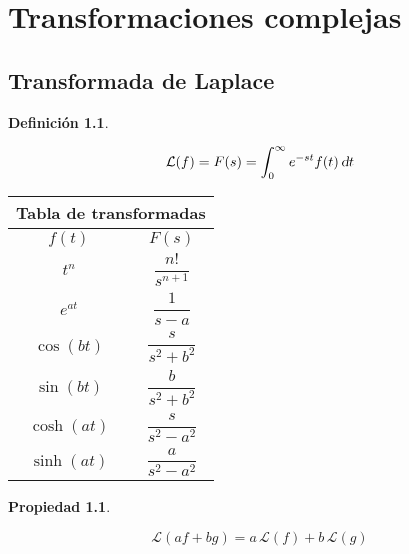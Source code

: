 \documentclass[a5paper,12pt,twoside]{book}
\newtheorem{defn}{{Definición}}[chapter]
\newtheorem{prop}{{Propiedad}}[chapter]
\begin{document}
\chapter{Transformaciones complejas}


\section{Transformada de Laplace}

\begin{mdframed}[style=MyFrame1]
    \begin{defn}
    \end{defn}
    \begin{equation*}
        \mathcal{L}(f) = F(s) = \int_0^\infty e^{-st} f(t) \, \textsl{d} t
    \end{equation*}
\end{mdframed}

\begin{center}
    \renewcommand{\arraystretch}{2.5}
    \begin{tabular}{|c|c|}
        \hline
        \multicolumn{2}{|c|}{Tabla de transformadas}
        \\ \hline \hline
        $f(t)$ & $F(s)$
        \\ \hline \hline
        $t^n$ & $\dfrac{n!}{s^{n+1}}$
        \\ \hline
        $e^{at}$ & $\dfrac{1}{s-a} $
        \\ \hline
        $\cos(bt)$ & $\dfrac{s}{s^2+b^2}$
        \\ \hline
        $\sin(bt)$ & $\dfrac{b}{s^2+b^2}$
        \\ \hline
        $\cosh(at)$ & $\dfrac{s}{s^2-a^2}$
        \\ \hline
        $\sinh(at)$ & $\dfrac{a}{s^2-a^2}$
        \\ \hline
    \end{tabular}
\end{center}

\begin{mdframed}[style=MyFrame1]
    \begin{prop}
    \end{prop}
    \begin{equation*}
        \mathcal{L}(af + bg) = a \, \mathcal{L}(f) + b \, \mathcal{L}(g)
    \end{equation*}
\end{mdframed}
\end{document}
